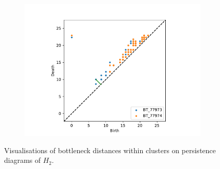 \begin{figure}[ht]
\begin{subfigure}{.49 \linewidth}
  \includegraphics[scale=0.5]{matchings/77973-77974.pdf}
  \end{subfigure}
  \caption{\label{ingroup-matching} Visualisations of bottleneck distances within clusters on persistence diagrams of $H_{2}$.}
\end{figure}
\clearpage
